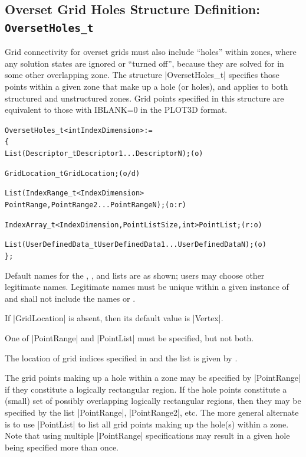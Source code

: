 \subsection{Overset Grid Holes Structure Definition: \texttt{OversetHoles\_t}}
\label{s:OversetHoles}

Grid connectivity for overset grids must also include ``holes'' within zones,
where any solution states are ignored or ``turned off'', because they are
solved for in some other overlapping zone.  The structure |OversetHoles_t|
specifies those points within a given zone that make up a hole (or holes),
and applies to both structured and unstructured zones.
Grid points specified in this structure are equivalent to those with
IBLANK=0 in the PLOT3D format.

\begin{alltt}
  OversetHoles\_t< int IndexDimension > :=
    \{
    List( Descriptor\_t Descriptor1 ... DescriptorN ) ;                      (o)

    GridLocation\_t GridLocation ;                                           (o/d)

    List( IndexRange\_t<IndexDimension> 
      PointRange, PointRange2 ... PointRangeN ) ;                           (o:r)

    IndexArray\_t<IndexDimension, PointListSize, int> PointList ;            (r:o)

    List( UserDefinedData\_t UserDefinedData1 ... UserDefinedDataN ) ;       (o)
    \} ;
\end{alltt}

\clearpage
\begin{notes}
\item
 Default names for the , , and
 lists are as shown; users may choose other legitimate names.
 Legitimate names must be unique 
 within a given instance of  and shall not include the
 names  or .
\item
 If |GridLocation| is absent, then its default value is |Vertex|.
\item
 One of |PointRange| and |PointList| must be specified, but not both.
\end{notes}

The location of grid indices specified in  and the
 list is given by .

The grid points making up a hole within a zone may be specified by
|PointRange| if they constitute a logically rectangular region.  If the hole
points constitute a (small) set of possibly overlapping logically rectangular
regions, then they may be specified by the list |PointRange|, |PointRange2|,
etc.  The more general alternate is to use |PointList| to list all grid
points making up the hole(s) within a zone.
Note that using multiple |PointRange| specifications may result in a
given hole being specified more than once.


